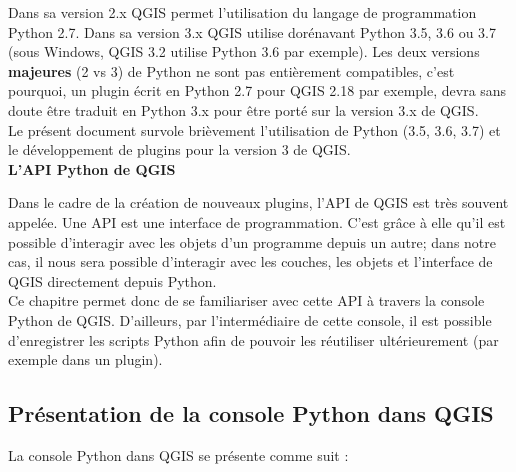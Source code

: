 \documentclass[11pt]{article}
\begin{document}
Dans sa version 2.x QGIS permet l'utilisation du langage de programmation Python 2.7. Dans sa version 3.x QGIS utilise dorénavant Python 3.5, 3.6 ou 3.7 (sous Windows, QGIS 3.2 utilise Python 3.6 par exemple). Les deux versions \textbf{majeures} (2 vs 3) de Python ne sont pas entièrement compatibles, c'est pourquoi, un plugin écrit en Python 2.7 pour QGIS 2.18 par exemple, devra sans doute être traduit en Python 3.x pour être porté sur la version 3.x de QGIS.\\

Le présent document survole brièvement l'utilisation de Python (3.5, 3.6, 3.7) et le développement de plugins pour la version 3 de QGIS. \\


\textbf{L'API Python de QGIS}\\\vspace*{-0.4em}

Dans le cadre de la création de nouveaux plugins, l'API de QGIS est très souvent appelée. Une API est une interface de programmation. C'est grâce à elle qu'il est possible d'interagir avec les objets d'un programme depuis un autre; dans notre cas, il nous sera possible d'interagir avec les couches, les objets et l'interface de QGIS directement depuis Python. \\

Ce chapitre permet donc de se familiariser avec cette API à travers la console Python de QGIS. D'ailleurs, par l'intermédiaire de cette console, il est possible d'enregistrer les scripts Python afin de pouvoir les réutiliser ultérieurement (par exemple dans un plugin). 


\subsection{Présentation de la console Python dans QGIS}
\label{Presentation}

La console Python dans QGIS se présente comme suit :
\end{document}
